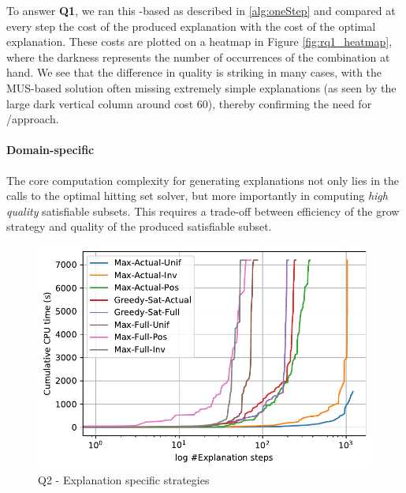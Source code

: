 To answer \textbf{Q1}, we ran this -based as described in \cref{alg:oneStep} and compared at every step the cost of the produced explanation with the cost of the optimal explanation. 
% 
These costs are plotted on a heatmap in Figure \ref{fig:rq1_heatmap}, where the darkness represents the number of occurrences of the combination at hand. 
We see that the difference in quality is striking in many cases, with the MUS-based solution often missing extremely simple explanations (as seen by the large dark vertical column around cost 60), thereby confirming  
the need for \omus/\comus approach.

\paragraph{Domain-specific \grow} The core computation complexity for generating explanations not only lies in the calls to the optimal hitting set solver, but more importantly in computing \emph{high quality} satisfiable subsets. This requires a trade-off between efficiency of the grow strategy and quality of the produced satisfiable subset.

\begin{figure}[ht]
  \centering
  \includegraphics[width=\columnwidth]{figures/loggrowWithSubsetmax.pdf}
  \caption{Q2 - Explanation specific \grow strategies}
  \label{fig:grow_strategies}
\end{figure}

